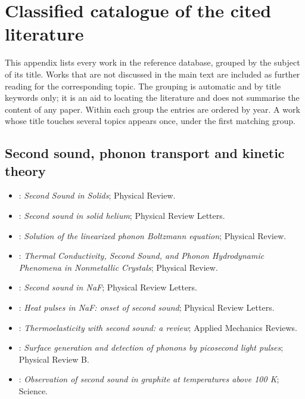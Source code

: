 \section{Classified catalogue of the cited literature}\label{app:catalogue}
This appendix lists every work in the reference database, grouped by the subject of its title. Works that are not discussed in the main text are included as further reading for the corresponding topic. The grouping is automatic and by title keywords only; it is an aid to locating the literature and does not summarise the content of any paper. Within each group the entries are ordered by year. A work whose title touches several topics appears once, under the first matching group.
\subsection{Second sound, phonon transport and kinetic theory}
\begin{itemize}\itemsep0pt\small
\item \citet{Chester1963}: \emph{Second Sound in Solids}; Physical Review.
\item \citet{Ackerman1966}: \emph{Second sound in solid helium}; Physical Review Letters.
\item \citet{GuyerKrumhansl1966}: \emph{Solution of the linearized phonon Boltzmann equation}; Physical Review.
\item \citet{GuyerKrumhansl1966II}: \emph{Thermal Conductivity, Second Sound, and Phonon Hydrodynamic Phenomena in Nonmetallic Crystals}; Physical Review.
\item \citet{Jackson1970}: \emph{Second sound in NaF}; Physical Review Letters.
\item \citet{McNelly1970}: \emph{Heat pulses in NaF: onset of second sound}; Physical Review Letters.
\item \citet{Chandrasekharaiah1986}: \emph{Thermoelasticity with second sound: a review}; Applied Mechanics Reviews.
\item \citet{Thomsen1986}: \emph{Surface generation and detection of phonons by picosecond light pulses}; Physical Review B.
\item \citet{Huberman2019}: \emph{Observation of second sound in graphite at temperatures above 100 K}; Science.
\end{itemize}
